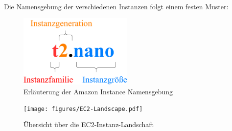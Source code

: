 \documentclass[titlepage]{report}
\begin{document}
\\
Die Namensgebung der verschiedenen Instanzen folgt einem festen Muster:
\begin{figure}[h]
    \centering
    \includegraphics[width=0.5\textwidth]{figures/instance.pdf}
    \caption{Erläuterung der Amazon Instance Namensgebung}\label{fig:2}
\end{figure}
\begin{figure}[h]
    \centering
    \texttt{[image: figures/EC2-Landscape.pdf]}
    \caption{Übersicht über die EC2\hyp{}Instanz\hyp{}Landschaft}\label{fig:3}
\end{figure}
\end{document}
